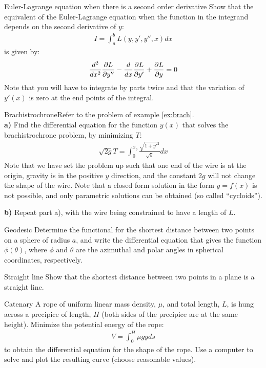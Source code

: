 \begin{problem}{Euler-Lagrange equation when there is a second order derivative}\label{prob_CalcVar_4} Show that the equivalent of the Euler-Lagrange equation when the function in the integrand depends on the second derivative of $y$:
\begin{align*}
I=\int_a^b L(y,y',y'',x)dx
\end{align*}
is given by:
\begin{align*}
\frac{d^2}{dx^2}\frac{\partial L}{\partial y''}-\frac{d}{dx}\frac{\partial L}{\partial y'}+\frac{\partial L}{\partial y}=0
\end{align*}
Note that you will have to integrate by parts twice and that the variation of $y'(x)$ is zero at the end points of the integral.
\end{problem}

\begin{problem}{Brachistrochrone}\label{prob_CalcVar_5}Refer to the problem of example \ref{ex:brach}.\\
\textbf{a)} Find the differential equation for the function $y(x)$ that solves the brachistrochrone problem, by minimizing $T$:
\begin{align*}
\sqrt{2g}T=\int_0^{x_b} \frac{\sqrt{1+y'^2}}{\sqrt{y}}dx
\end{align*}
Note that we have set the problem up such that one end of the wire is at the origin, gravity is in the positive $y$ direction, and the constant $2g$ will not change the shape of the wire. Note that a closed form solution in the form $y=f(x)$ is not possible, and only parametric solutions can be obtained (so called ``cycloids'').

\textbf{b)} Repeat part a), with the wire being constrained to have a length of $L$.
\end{problem}

\begin{problem}{Geodesic}\label{prob_CalcVar_6} Determine the functional for the shortest distance between two points on a sphere of radius $a$, and write the differential equation that gives the function $\phi(\theta)$, where $\phi$ and $\theta$ are the azimuthal and polar angles in spherical coordinates, respectively.
\end{problem}

\begin{problem}{Straight line}\label{prob_CalcVar_7} Show that the shortest distance between two points in a plane is a straight line.
\end{problem}

\begin{problem}{Catenary}\label{prob_CalcVar_8} A rope of uniform linear mass density, $\mu$, and total length, $L$, is hung across a precipice of length, $H$ (both sides of the precipice are at the same height). Minimize the potential energy of the rope:
\begin{align*}
V=\int_0^H \mu g y ds
\end{align*} 
to obtain the differential equation for the shape of the rope. Use a computer to solve and plot the resulting curve (choose reasonable values).
\end{problem}

